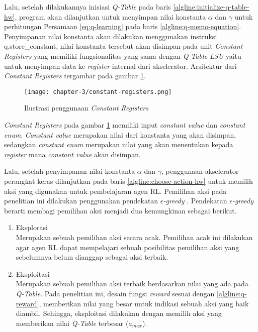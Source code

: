 Lalu, setelah dilakukannya inisiasi \textit{Q-Table} pada baris \ref{algline:initialize-q-table-hw}, program akan dilanjutkan untuk menyimpan nilai konstanta $\alpha$ dan $\gamma$ untuk perhitungan Persamaan \ref{eq:q-learning} pada baris \ref{algline:q-memo-equation}. Penyimpanan nilai konstanta akan dilakukan menggunakan instruksi q.store\_constant, nilai konstanta tersebut akan disimpan pada unit \textit{Constant Registers} yang memiliki fungsionalitas yang sama dengan \textit{Q-Table \ac{LSU}} yaitu untuk menyimpan data ke \textit{register} internal dari akselerator. Arsitektur dari \textit{Constant Registers} tergambar pada gambar \ref{fig:constant-registers}.

\begin{figure}[H]
	\centering
	\texttt{[image: chapter-3/constant-registers.png]}
	\caption{Ilustrasi penggunaan \textit{Constant Registers}}
	\label{fig:constant-registers}
\end{figure}

\textit{Constant Registers} pada gambar \ref{fig:constant-registers} memiliki input \textit{constant value} dan \textit{constant enum}. \textit{Constant value} merupakan nilai dari konstanta yang akan disimpan, sedangkan \textit{constant enum} merupakan nilai yang akan menentukan kepada \textit{register} mana \textit{constant value} akan disimpan.

Lalu, setelah penyimpanan nilai konstanta $\alpha$ dan $\gamma$, penggunaan akselerator perangkat keras dilanjutkan pada baris \ref{algline:choose-action-hw} untuk memilih aksi yang digunakan untuk pembelajaran agen \ac{RL}. Pemilihan aksi pada penelitian ini dilakukan penggunakan pendekatan \textit{$\epsilon$-greedy} \parencite{christopher1989learning}. Pendekatan \textit{$\epsilon$-greedy} berarti membagi pemilihan aksi menjadi dua kemungkinan sebagai berikut.

\begin{enumerate}
	\item Eksplorasi\\
	      Merupakan sebuah pemilihan aksi secara acak. Pemilihan acak ini dilakukan agar agen \ac{RL} dapat mempelajari sebuah posibilitas pemilihan aksi yang sebelumnya belum dianggap sebagai aksi terbaik.
	\item Eksploitasi\\
	      Merupakan sebuah pemilihan aksi terbaik berdasarkan nilai yang ada pada \textit{Q-Table}. Pada penelitian ini, desain fungsi \textit{reward} sesuai dengan \ref{algline:q-reward}, memberikan nilai yang besar untuk indikasi sebuah aksi yang baik diambil. Sehingga, eksploitasi dilakukan dengan memilih aksi yang memberikan nilai \textit{Q-Table} terbesar ($a_{max}$).
\end{enumerate}

